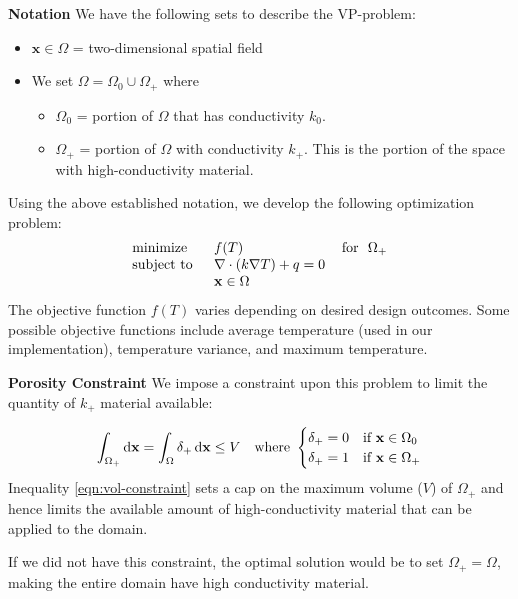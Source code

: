 \documentclass[final]{beamer}
\begin{document}
\begin{frame}[t]{\textbf{Notation}}
	We have the following sets to describe the VP-problem:
	\begin{itemize}
		\item $\mathbf{x}\in\Omega$ = two-dimensional spatial field
		\item[] We set $\Omega = \Omega_0\cup\Omega_+$ where
		\begin{itemize}
			\item $\Omega_0$ = portion of $\Omega$ that has conductivity $k_0$.
			\item $\Omega_+$ = portion of $\Omega$ with conductivity $k_+$. This is the portion of the space with high-conductivity material.
		\end{itemize}
	\end{itemize}\vfill\pause
	Using the above established notation, we develop the following optimization problem:
	\begin{equation}
		\begin{tabular}{lll}
			\text{minimize }   & $f(T)$                                                   & \text{for } $\Omega_+$ \\
			\text{subject to } & $\nabla\cdot\left(k\nabla T\right)+q=0$  &                                      \\
			& $\mathbf{x}\in\Omega$ &                                      
		\end{tabular}\label{SIMP-Optimization-Problem}
	\end{equation}\vfill\pause
	The objective function $f(T)$ varies depending on desired design outcomes. Some possible objective functions include average temperature (used in our implementation), temperature variance, and maximum temperature.
\end{frame}

\begin{frame}{\textbf{Porosity Constraint}}
	We impose a constraint upon this problem to limit the quantity of $k_+$ material available:
	
	\begin{equation}
		\int_{\Omega_+}\dif\mathbf{x}=\int_{\Omega}\delta_+\dif\mathbf{x}\leq V\quad\text{where }\begin{cases}\delta_+ = 0 & \text{if }\mathbf{x}\in\Omega_0 \\ \delta_+ = 1 & \text{if }\mathbf{x}\in\Omega_+\end{cases}\label{eqn:vol-constraint}
	\end{equation}\vfill\pause
	Inequality \eqref{eqn:vol-constraint} sets a cap on the maximum volume ($V$) of $\Omega_+$ and hence limits the available amount of high-conductivity material that can be applied to the domain.\vfill
	
	If we did not have this constraint, the optimal solution would be to set $\Omega_+=\Omega$, making the entire domain have high conductivity material.\vfill
\end{frame}
\end{document}
